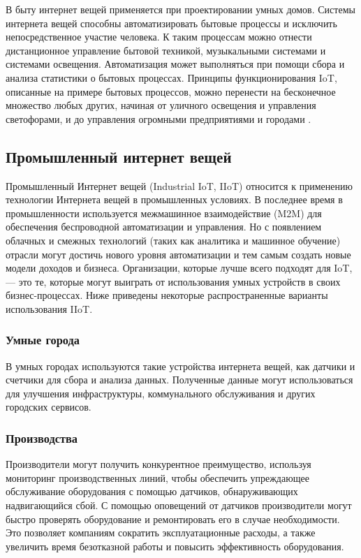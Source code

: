 В быту интернет вещей применяется при проектировании умных домов. Системы интернета вещей способны автоматизировать бытовые процессы и исключить непосредственное участие человека. К таким процессам можно отнести дистанционное управление бытовой техникой, музыкальными системами и системами освещения. Автоматизация может выполняться при помощи сбора и анализа статистики о бытовых процессах. Принципы функционирования IoT, описанные на примере бытовых процессов, можно перенести на бесконечное множество любых других, начиная от уличного освещения и управления светофорами, и до управления огромными предприятиями и городами \cite{Kaspersky}.

\subsection{Промышленный интернет вещей}

Промышленный Интернет вещей (Industrial IoT, IIoT) \cite{Oracle} относится к применению технологии Интернета вещей в промышленных условиях. В последнее время в промышленности используется межмашинное взаимодействие (M2M) для обеспечения беспроводной автоматизации и управления. Но с появлением облачных и смежных технологий (таких как аналитика и машинное обучение) отрасли могут достичь нового уровня автоматизации и тем самым создать новые модели доходов и бизнеса. Организации, которые лучше всего подходят для IoT, --- это те, которые могут выиграть от использования умных устройств в своих бизнес-процессах. Ниже приведены некоторые распространенные варианты использования IIoT.

\subsubsection{Умные города}

В умных городах используются такие устройства интернета вещей, как датчики и счетчики для сбора и анализа данных. Полученные данные могут использоваться для улучшения инфраструктуры, коммунального обслуживания и других городских сервисов.

\subsubsection{Производства}

Производители могут получить конкурентное преимущество, используя мониторинг производственных линий, чтобы обеспечить упреждающее обслуживание оборудования с помощью датчиков, обнаруживающих надвигающийся сбой. С помощью оповещений от датчиков производители могут быстро проверять оборудование и ремонтировать его в случае необходимости. Это позволяет компаниям сократить эксплуатационные расходы, а также увеличить время безотказной работы и повысить эффективность оборудования.

